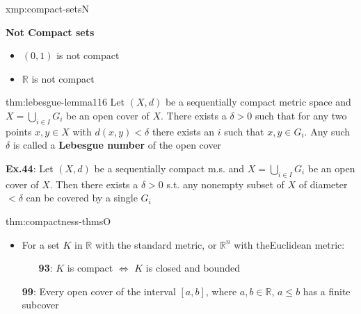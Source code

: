 \documentclass[landscape, 8pt]{extarticle}
\begin{document}
\begin{multicols}{3}
\begin{xmp}{xmp:compact-sets}{N}
\begin{multicols}{2}
        \textbf{Not Compact sets}
        \vspace{-5pt}
        \begin{itemize}[leftmargin=*]
            \item $(0, 1)$ is not compact
            \item $\mathbb{R}$ is not compact
        \end{itemize}
    \end{multicols}
    \vspace{-8pt}
\end{xmp}

\vspace{-6pt}
\begin{thm}{thm:lebesgue-lemma}{116}
    \vspace{-6pt}
    Let $(X, d)$ be a sequentially compact metric space and $X = \bigcup_{i\in I} G_{i}$ be an open cover of $X$. There exists a $\delta > 0$ such that for any two points $x, y\in X$ with $d(x, y) < \delta$ there exists an $i$ such that $x, y\in G_{i}$. Any such $\delta$ is called a \textbf{Lebesgue number} of the open cover

    \longrule{0.08ex}
    \textbf{Ex.44}: Let $(X, d)$ be a sequentially compact m.s. and $X = \bigcup_{i\in I} G_{i}$ be an open cover of $X$. Then there exists a $\delta > 0$ s.t. any nonempty subset of $X$ of diameter $< \delta$ can be covered by a single $G_{i}$
\end{thm}

\vspace{-6pt}
\begin{thm}{thm:compactness-thms}{O}
    \vspace{-5pt}
    \vspace{-7pt}
    \begin{itemize}[leftmargin=1.5em]
        \item For a set $K$ in $\mathbb{R}$ with the standard metric, or $\mathbb{R}^{n}$ with the\newline Euclidean metric:
            \vspace{-5pt}
            \begin{itemize}
                \item[\textbf{93}:] $K$ is compact $\iff$ $K$ is closed and bounded
            \end{itemize}

        \vspace{-5pt}
    \item[\textbf{99}:] Every open cover of the interval $[a, b]$, where $a, b\in \mathbb{R}$, $a \le b$ has a finite subcover


\end{itemize}
\end{thm}
\end{multicols}
\end{document}
